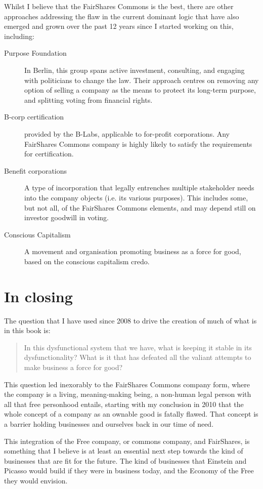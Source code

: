 Whilst I believe that the FairShares Commons is the best, there are other approaches addressing the flaw in the current dominant logic that have also emerged and grown over the past 12 years since I started working on this, including:


\begin{description}
\item[Purpose Foundation]  In Berlin, this group spans active investment, consulting, and engaging with politicians to change the law. Their approach centres on removing any option of selling a company as the means to protect its long-term purpose, and splitting voting from financial rights. 
\item[B-corp certification]  provided by the B-Labs, applicable to for-profit corporations. Any FairShares Commons company is highly likely to satisfy the requirements for certification.
\item[Benefit corporations] A type of incorporation that legally entrenches multiple stakeholder needs into the company objects (i.e. its various purposes). This includes some, but not all, of the FairShares Commons elements, and may depend still on investor goodwill in voting.
\item[Conscious Capitalism]  A movement and organisation promoting business as a force for good, based on the conscious capitalism credo\cite{mackey-conscious}.
\end{description}




\section{In closing}
The question that I have used since 2008 to drive the creation of much of what is in this book is: 


\begin{quote}
In this dysfunctional system that we have, what is keeping it stable in its dysfunctionality? What is it that has defeated all the valiant attempts to make business a force for good?
\end{quote}


This question led inexorably to the FairShares Commons company form, where the company is a living, meaning\hyp{}making being, a non-human legal person with all that free personhood entails, starting with my conclusion in 2010 that the whole concept of a company as an ownable good is fatally flawed. That concept is a barrier holding businesses and ourselves back in our time of need.


This integration of the Free company, or commons company, and FairShares, is something that I believe is at least an essential next step towards the kind of businesses that are fit for the future. The kind of businesses that Einstein and Picasso would build if they were in business today, and the Economy of the Free they would envision.